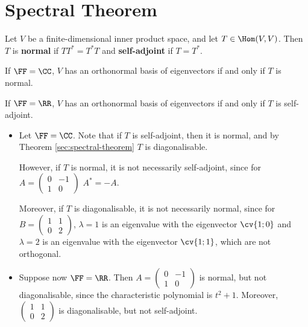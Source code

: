 \documentclass[11pt]{scrartcl}
\begin{document}
\section{Spectral Theorem}

\begin{definition}
  Let $V$ be a finite-dimensional inner product space, and let $T \in \Hom(V,V)$. Then $T$ is \textbf{normal} if $TT^{*} = T^{*}T$ and \textbf{self-adjoint} if $T = T^{*}$.
\end{definition}

\begin{theorem}
  \label{sec:spectral-theorem}
  If $\FF = \CC$, $V$ has an orthonormal basis of eigenvectors if and only if $T$ is normal.

  If $\FF = \RR$, $V$ has an orthonormal basis of eigenvectors if and only if $T$ is self-adjoint.
\end{theorem}

\begin{example}

\begin{itemize}
\item Let $\FF = \CC$. Note that if $T$ is self-adjoint, then it is normal, and by Theorem \ref{sec:spectral-theorem} $T$ is diagonalisable.

  However, if $T$ is normal, it is not necessarily self-adjoint, since for $A = 
  \begin{pmatrix}
    0 & -1\\
    1 & 0
  \end{pmatrix}
  $ $A^{*}= -A$.

  Moreover, if $T$ is diagonalisable, it is not necessarily normal, since for $B = 
  \begin{pmatrix}
    1 & 1  \\
    0 & 2
  \end{pmatrix}
$, $\lambda = 1$ is an eigenvalue with the eigenvector $\cv{1;0}$ and $\lambda = 2$ is an eigenvalue with the eigenvector $\cv{1;1}$, which are not orthogonal.
\item Suppose now $\FF = \RR$. Then $A  = 
  \begin{pmatrix}
    0 & -1 \\
    1 & 0
  \end{pmatrix}
  $ is normal, but not diagonalisable, since the characteristic polynomial is $t^2+1$. Moreover, $
  \begin{pmatrix}
    1 & 1\\
    0 & 2
  \end{pmatrix}
$ is diagonalisable, but not self-adjoint.
\end{itemize}
\end{example}
\end{document}
